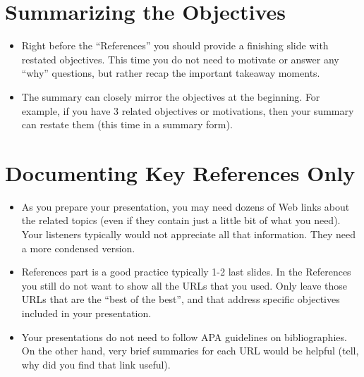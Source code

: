 \documentclass[jou]{apa6}
\begin{document}
\section{Summarizing the Objectives}

\begin{itemize}
\item Right before the ``References'' you should provide a finishing slide with 
restated objectives. This time you do not need to motivate or answer any ``why'' questions, 
but rather recap the important takeaway moments. 
\item The summary can closely mirror the objectives at the beginning. 
For example, if you have 3 related objectives or motivations, then your summary 
can restate them (this time in a summary form).
\end{itemize}


\section{Documenting Key References Only}

\begin{itemize}
\item As you prepare your presentation, you may need dozens of Web links about 
the related topics (even if they contain just a little bit of what you need). 
Your listeners typically would not appreciate all that information. They need a more 
condensed version.
\item References part is a good practice \textendash{} typically 1-2 last slides.
In the References you still do not want to show all the URLs that you used. 
Only leave those URLs that are the ``best of the best'', and that address specific objectives 
included in your presentation.
\item Your presentations do not need to follow APA guidelines on bibliographies.
On the other hand, very brief summaries for each URL would be helpful 
(tell, why did you find that link useful). 
\end{itemize}
\end{document}
